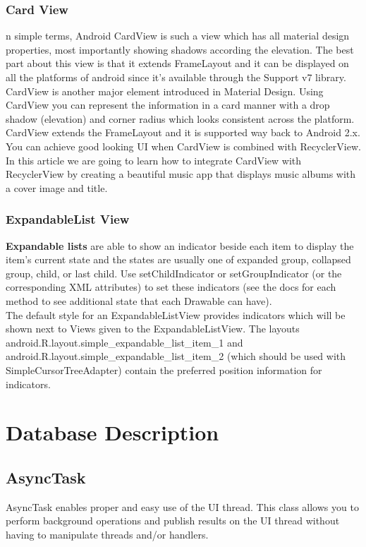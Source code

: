 \documentclass[twoside,a4paper,16pt]{book}
\begin{document}
\begin{itemize}
\begin{enumerate}
\begin{enumerate}
\subsection{Card View}
n simple terms, Android CardView is such a view which has all material design properties, most importantly showing shadows according the elevation. The best part about this view is that it extends FrameLayout and it can be displayed on all the platforms of android since it’s available through the Support v7 library.\\
CardView is another major element introduced in Material Design. Using CardView you can represent the information in a card manner with a drop shadow (elevation) and corner radius which looks consistent across the platform. CardView extends the FrameLayout and it is supported way back to Android 2.x.\\
You can achieve good looking UI when CardView is combined with RecyclerView. In this article we are going to learn how to integrate CardView with RecyclerView by creating a beautiful music app that displays music albums with a cover image and title.

\subsection{ExpandableList View}
{\bf Expandable lists} are able to show an indicator beside each item to display the item's current state and the states are usually one of expanded group, collapsed group, child, or last child. Use setChildIndicator or setGroupIndicator (or the corresponding XML attributes) to set these indicators (see the docs for each method to see additional state that each Drawable can have).\\
 The default style for an ExpandableListView provides indicators which will be shown next to Views given to the ExpandableListView. The layouts android.R.layout.simple_expandable_list_item_1 and android.R.layout.simple_expandable_list_item_2 (which should be used with SimpleCursorTreeAdapter) contain the preferred position information for indicators.



\chapter{Database Description}

\section{AsyncTask}
AsyncTask enables proper and easy use of the UI thread. This class allows you to perform background operations and publish results on the UI thread without having to manipulate threads and/or handlers.\\


\end{enumerate}
\end{enumerate}
\end{itemize}
\end{document}
